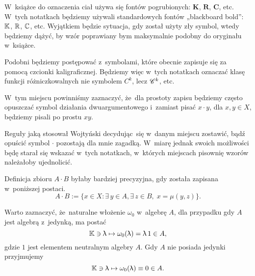 \documentclass[a4paper,11pt]{article}
\begin{document}
\newpage





\start W~książce do oznaczenia ciał używa się fontów pogrubionych:
$\mathbf{K}$, $\mathbf{R}$, $\mathbf{C}$, etc. W~tych notatkach będziemy
używali standardowych fontów „blackboard bold”: $\mathbb{K}$, $\mathbb{R}$, $\mathbb{C}$, etc.
Wyjątkiem będzie sytuacja, gdy został użyty zły symbol, wtedy będziemy
dążyć, by wzór poprawiany bym maksymalnie podobny do oryginału w~książce.

Podobni będziemy postępować z~symbolami, które obecnie zapisuje się za
pomocą czcionki kaligraficznej. Będziemy więc w~tych notatkach oznaczać
klasę funkcji różniczkowalnych nie symbolem $C^{ k }$, lecz $\mathcal{C}^{ k }$, etc.





\start {} W~tym miejscu powinniśmy zaznaczyć, że~dla prostoty zapisu
będziemy często opuszczać symbol działania dwuargumentowego i~zamiast pisać
$x \cdot y$, dla $x, y \in X$, będziemy pisali po prostu $x y$.

Reguły jaką stosował Wojtyński decydując~się w~danym miejscu zostawić, bądź
opuścić symbol $\cdot$ pozostają dla mnie zagadką. W~miarę jednak swoich
możliwości będę starał się wskazać w~tych notatkach, w~których miejscach
pisownię wzorów należałoby ujednolicić.

\vspace{\spaceFour}





\start {} Definicja zbioru $A \cdot B$ byłaby bardziej precyzyjna, gdy
została zapisana w~poniższej postaci.
\begin{equation}
  \label{eq:Wojtynski-01}
  A \cdot B := \{ x \in X : \exists\, y \in A, \exists\, z \in B,\; x = \mu( y, z ) \}.
\end{equation}

\vspace{\spaceFour}





\start {} Warto zaznaczyć, że~naturalne włożenie $\omega_{ 0 }$ w~algebrę
$A$, dla przypadku gdy $A$ jest algebrą z~jedynką, ma postać
\begin{equation}
  \label{eq:Wojtynski-02}
  \mathbb{K} \ni \uplambda \mapsto \omega_{ 0 }( \uplambda ) = \uplambda \, 1 \in A,
\end{equation}
gdzie $1$ jest elementem neutralnym algebry $A$. Gdy $A$ nie posiada jedynki
przyjmujemy
\begin{equation}
  \label{eq:Wojtynski-03}
  \mathbb{K} \ni \uplambda \mapsto \omega_{ 0 }( \uplambda ) \equiv 0 \in A.
\end{equation}
\end{document}
